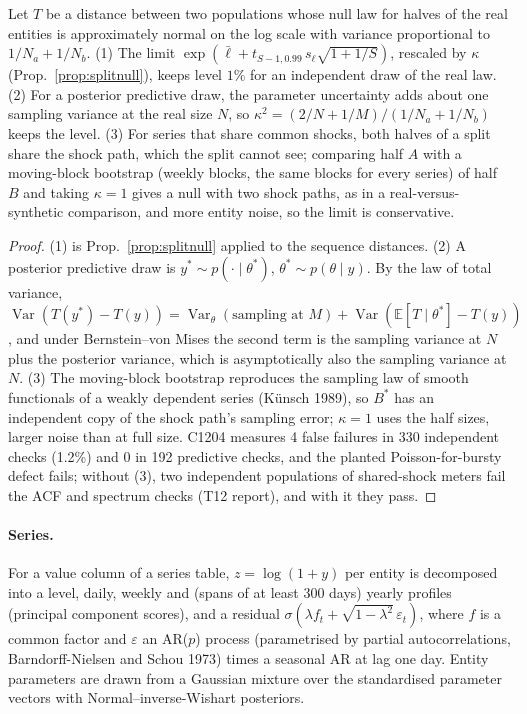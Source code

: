 \begin{proposition}\label{prop:tscalib}
Let $T$ be a distance between two populations whose null law for halves of the real entities is approximately
normal on the log scale with variance proportional to $1/N_a+1/N_b$. (1) The limit
$\exp(\bar\ell+t_{S-1,0.99}\,s_\ell\sqrt{1+1/S})$, rescaled by $\kappa$ (Prop.~\ref{prop:splitnull}), keeps level $1\%$ for an
independent draw of the real law. (2) For a posterior predictive draw, the parameter uncertainty adds about one
sampling variance at the real size $N$, so $\kappa^2=(2/N+1/M)/(1/N_a+1/N_b)$ keeps the level. (3) For series that
share common shocks, both halves of a split share the shock path, which the split cannot see; comparing half $A$ with
a moving-block bootstrap (weekly blocks, the same blocks for every series) of half $B$ and taking $\kappa=1$ gives a
null with two shock paths, as in a real-versus-synthetic comparison, and more entity noise, so the limit is
conservative.
\end{proposition}
\begin{proof}
(1) is Prop.~\ref{prop:splitnull} applied to the sequence distances. (2) A posterior predictive draw is
$y^*\sim p(\cdot\mid\theta^*)$, $\theta^*\sim p(\theta\mid y)$. By the law of total variance,
$\operatorname{Var}(T(y^*)-T(y))=\operatorname{Var}_{\theta}(\text{sampling at }M)+\operatorname{Var}(\mathbb E[T\mid\theta^*]-T(y))$,
and under Bernstein--von Mises the second term is the sampling variance at $N$ plus the posterior variance, which is
asymptotically also the sampling variance at $N$. (3) The moving-block bootstrap reproduces the sampling law of
smooth functionals of a weakly dependent series (K\"unsch 1989), so $B^*$ has an independent copy of the shock
path's sampling error; $\kappa=1$ uses the half sizes, larger noise than at full size. C1204 measures 4 false failures
in 330 independent checks (1.2\%) and 0 in 192 predictive checks, and the planted Poisson-for-bursty defect fails;
without (3), two independent populations of shared-shock meters fail the ACF and spectrum checks (T12
report), and with it they pass.
\end{proof}

\paragraph{Series.} For a value column of a series table, $z=\log(1+y)$ per entity is decomposed into a level, daily,
weekly and (spans of at least 300 days) yearly profiles (principal component scores), and a residual
$\sigma(\lambda f_t+\sqrt{1-\lambda^2}\,\varepsilon_t)$, where $f$ is a common factor and $\varepsilon$ an AR($p$)
process (parametrised by partial autocorrelations, Barndorff-Nielsen and Schou 1973) times a seasonal AR at lag one
day. Entity parameters are drawn from a Gaussian mixture over the standardised parameter vectors with
Normal--inverse-Wishart posteriors.


